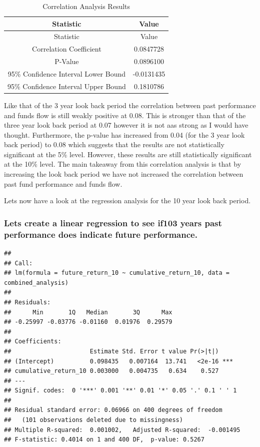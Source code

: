 \documentclass[11pt,preprint, authoryear]{elsarticle}
\numberwithin{equation}{section}
\numberwithin{figure}{section}
\numberwithin{table}{section}
\begin{document}
\begin{longtable}[]{@{}cc@{}}
\caption{Correlation Analysis Results}\tabularnewline
\toprule\noalign{}
Statistic & Value \\
\midrule\noalign{}
\endfirsthead
\toprule\noalign{}
Statistic & Value \\
\midrule\noalign{}
\endhead
\bottomrule\noalign{}
\endlastfoot
Correlation Coefficient & 0.0847728 \\
P-Value & 0.0896100 \\
95\% Confidence Interval Lower Bound & -0.0131435 \\
95\% Confidence Interval Upper Bound & 0.1810786 \\
\end{longtable}

Like that of the 3 year look back period the correlation between past
performance and funds flow is still weakly positive at 0.08. This is
stronger than that of the three year look back period at 0.07 however it
is not aas strong as I would have thought. Furthermore, the p-value has
increased from 0.04 (for the 3 year look back period) to 0.08 which
suggests that the results are not statistically significant at the 5\%
level. However, these results are still statistically significant at the
10\% level. The main takeaway from this correlation analysis is that by
increasing the look back period we have not increased the correlation
between past fund performance and funds flow.

Lets now have a look at the regression analysis for the 10 year look
back period.

\hypertarget{lets-create-a-linear-regression-to-see-if103-years-past-performance-does-indicate-future-performance.}{%
\subsubsection{Lets create a linear regression to see if103 years past
performance does indicate future
performance.}\label{lets-create-a-linear-regression-to-see-if103-years-past-performance-does-indicate-future-performance.}}

\begin{verbatim}
## 
## Call:
## lm(formula = future_return_10 ~ cumulative_return_10, data = combined_analysis)
## 
## Residuals:
##      Min       1Q   Median       3Q      Max 
## -0.25997 -0.03776 -0.01160  0.01976  0.29579 
## 
## Coefficients:
##                      Estimate Std. Error t value Pr(>|t|)    
## (Intercept)          0.098435   0.007164  13.741   <2e-16 ***
## cumulative_return_10 0.003000   0.004735   0.634    0.527    
## ---
## Signif. codes:  0 '***' 0.001 '**' 0.01 '*' 0.05 '.' 0.1 ' ' 1
## 
## Residual standard error: 0.06966 on 400 degrees of freedom
##   (101 observations deleted due to missingness)
## Multiple R-squared:  0.001002,   Adjusted R-squared:  -0.001495 
## F-statistic: 0.4014 on 1 and 400 DF,  p-value: 0.5267
\end{verbatim}
\end{document}
